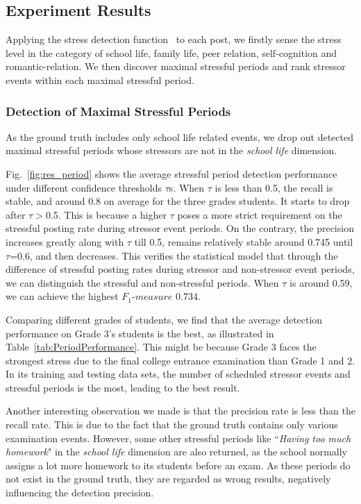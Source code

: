 \subsection{Experiment Results}
Applying the stress detection function~\cite{HIS} to each post,
we firstly sense the stress level in the category of school life, family life, peer relation, self-cognition and romantic-relation.
We then discover maximal stressful periods and rank stressor events within each maximal stressful period.

\subsubsection{Detection of Maximal Stressful Periods}

As the ground truth includes only school life related events,
we drop out detected maximal stressful periods whose stressors are not in the \emph{school life} dimension.

Fig.~\ref{fig:res_period} shows the average stressful period detection performance under different confidence thresholds $\tau$s.
When $\tau$ is less than 0.5, the recall is stable, and around 0.8 on average for the three grades students.
It starts to drop after $\tau$$>$0.5.
This is because a higher $\tau$ poses a more strict requirement on the stressful posting rate
during stressor event periods.
On the contrary, the precision increases greatly along with $\tau$ till 0.5, remains relatively stable around 0.745 until $\tau$=0.6,
and then decreases.
This verifies the statistical model that through the difference of stressful posting rates during stressor and non-stressor event periods,
we can distinguish the stressful and non-stressful periods.
When $\tau$ is around 0.59, we can achieve the highest $F_1$-$measure$ 0.734.

Comparing different grades of students, we find that the average detection performance
on Grade 3's students is the best, as illustrated in
Table~\ref{tab:PeriodPerformance}.
This might be because Grade 3 faces the strongest stress due to the final college entrance examination
than Grade 1 and 2. In its training and testing data sets, the number of scheduled stressor events and stressful periods is the most,
leading to the best result.

Another interesting observation we made is that the precision rate is less than the recall rate.
This is due to the fact that the ground truth contains only various examination events.
However, some other stressful periods like ``\emph{Having too much homework}" in the \emph{school life} dimension
are also returned, as the school normally assigns a lot more homework to its students before an exam.
As these periods do not exist in the ground truth, they are regarded as wrong results,
negatively influencing the detection precision.

